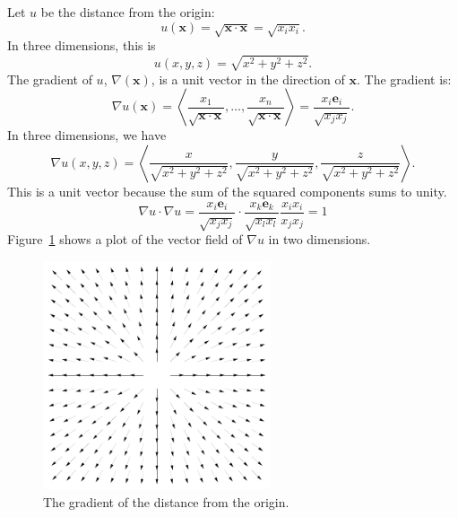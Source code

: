 \begin{Example}
  Let $u$ be the distance from the origin: 
  \[
  u(\mathbf{x}) = \sqrt{\mathbf{x} \cdot \mathbf{x}} = \sqrt{x_i x_i}.
  \]
  In three dimensions, this is
  \[
  u(x, y, z) = \sqrt{x^2 + y^2 + z^2}.
  \]
  The gradient of $u$, $\nabla(\mathbf{x})$, is a unit vector in the direction 
  of $\mathbf{x}$.  The gradient is:
  \[
  \nabla u(\mathbf{x})
  = \left\langle \frac{x_1}{ \sqrt{ \mathbf{x} \cdot \mathbf{x} } }, \ldots,
    \frac{x_n}{ \sqrt{ \mathbf{x} \cdot \mathbf{x} } } \right\rangle
  = \frac{ x_i \mathbf{e}_i }{ \sqrt{ x_j x_j } }.
  \]
  In three dimensions, we have
  \[
  \nabla u(x, y, z) = \left \langle
    \frac{x}{\sqrt{x^2 + y^2 + z^2}},
    \frac{y}{\sqrt{x^2 + y^2 + z^2}},
    \frac{z}{\sqrt{x^2 + y^2 + z^2}} \right \rangle.
  \]
  This is a unit vector because the sum of the squared components sums to unity.
  \[
  \nabla u \cdot \nabla u = 
  \frac{ x_i \mathbf{e}_i }{ \sqrt{ x_j x_j } } \cdot
  \frac{ x_k \mathbf{e}_k }{ \sqrt{ x_l x_l } }
  \frac{ x_i x_i }{ x_j x_j } = 1
  \]
  Figure~\ref{grad_dist} shows a plot of the vector field of $\nabla u$ in 
  two dimensions.
  \begin{figure}[h!]
    \begin{center}
      \includegraphics[width=0.6\textwidth]{calculus/vector/grad_dist}
    \end{center}
    \caption{The gradient of the distance from the origin.}
    \label{grad_dist}
  \end{figure}
\end{Example}












